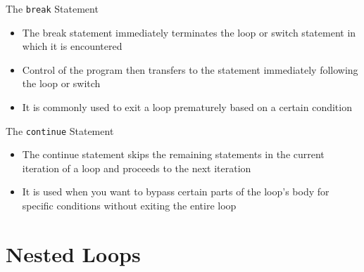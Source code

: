 \documentclass[12pt, aspectratio=169]{beamer}
\begin{document}
    \begin{frame}{The \texttt{break} Statement}
        \begin{itemize}
            \item The break statement immediately terminates the loop or switch statement in which it is encountered
            \item Control of the program then transfers to the statement immediately following the loop or switch
            \item It is commonly used to exit a loop prematurely based on a certain condition
        \end{itemize}
    \end{frame}




    \begin{frame}{The \texttt{continue} Statement}
        \begin{itemize}
            \item The continue statement skips the remaining statements in the current iteration of a loop and proceeds to the next iteration
            \item It is used when you want to bypass certain parts of the loop's body for specific conditions without exiting the entire loop
        \end{itemize}
    \end{frame}




    \section{Nested Loops}
\end{document}
